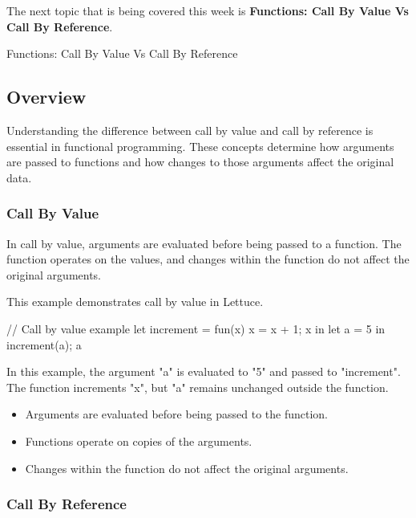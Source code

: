 The next topic that is being covered this week is \textbf{Functions: Call By Value Vs Call By Reference}.

\begin{notes}{Functions: Call By Value Vs Call By Reference}
    \subsection*{Overview}

    Understanding the difference between call by value and call by reference is essential in functional programming. These concepts determine how arguments are passed to functions and how changes to those arguments affect the original data.
    
    \subsubsection*{Call By Value}
    
    In call by value, arguments are evaluated before being passed to a function. The function operates on the values, and changes within the function do not affect the original arguments.
    
    \begin{highlight}
    
        This example demonstrates call by value in Lettuce.
    
    \begin{code}[Lettuce]
    // Call by value example
    let increment = fun(x) {
        x = x + 1;
        x
    } in
    let a = 5 in
    increment(a); a
    \end{code}
    
        In this example, the argument "a" is evaluated to "5" and passed to "increment". The function increments "x", but "a" remains unchanged outside the function.
    
        \begin{itemize}
            \item Arguments are evaluated before being passed to the function.
            \item Functions operate on copies of the arguments.
            \item Changes within the function do not affect the original arguments.
        \end{itemize}
    
    \end{highlight}
    
    \subsubsection*{Call By Reference}
    

\end{notes}
